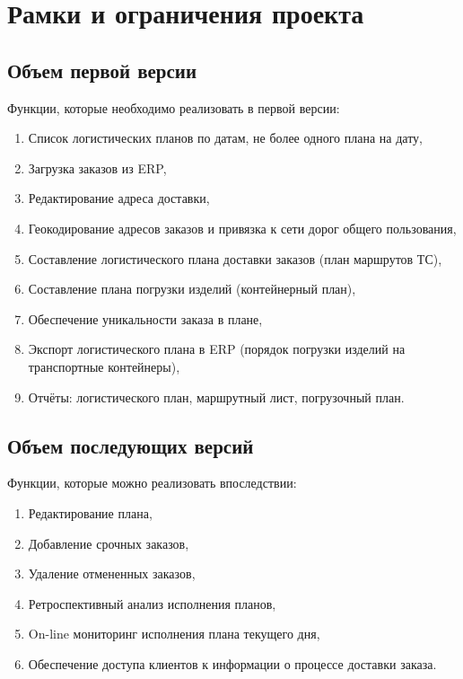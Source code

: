 \chapter{Рамки и ограничения проекта}
\label{ch:chap3}


\section{Объем первой версии}
\label{sec:mvp}

Функции, которые необходимо реализовать в первой версии:
\begin{enumerate}[label=MVP-\arabic*]
    \item Список логистических планов по датам, не более одного плана на дату,
    \item Загрузка заказов из ERP,
    \item Редактирование адреса доставки,
    \item Геокодирование адресов заказов и привязка к сети дорог общего пользования,
    \item Составление логистического плана доставки заказов (план маршрутов ТС),
    \item Составление плана погрузки изделий (контейнерный план),
    \item Обеспечение уникальности заказа в плане,
    \item Экспорт логистического плана в ERP (порядок погрузки изделий на транспортные контейнеры),
    \item Отчёты: логистического план, маршрутный лист, погрузочный план.
\end{enumerate}


\section{Объем последующих версий}
\label{sec:next}

Функции, которые можно реализовать впоследствии:
\begin{enumerate}[label=NXT-\arabic*]
    \item Редактирование плана,
    \item Добавление срочных заказов,
    \item Удаление отмененных заказов,
    \item Ретроспективный анализ исполнения планов,
    \item On-line мониторинг исполнения плана текущего дня,
    \item Обеспечение доступа клиентов к информации о процессе доставки заказа.
\end{enumerate}


